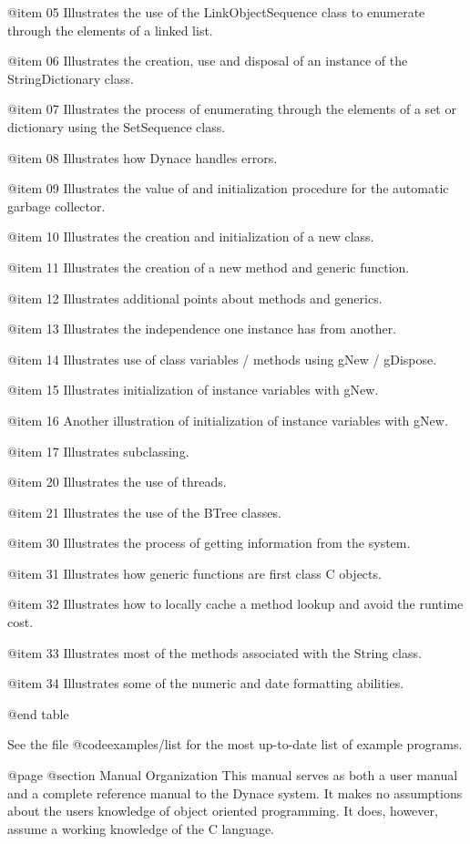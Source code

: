 @item 05
Illustrates the use of the LinkObjectSequence class to enumerate through
the elements of a linked list.

@item 06
Illustrates the creation, use and disposal of an instance of the
StringDictionary class.

@item 07
Illustrates the process of enumerating through the elements of a
set or dictionary using the SetSequence class.

@item 08
Illustrates how Dynace handles errors.

@item 09
Illustrates the value of and initialization procedure for the automatic
garbage collector.

@item 10
Illustrates the creation and initialization of a new class.

@item 11
Illustrates the creation of a new method and generic function.

@item 12
Illustrates additional points about methods and generics.

@item 13
Illustrates the independence one instance has from another.

@item 14
Illustrates use of class variables / methods using gNew / gDispose.

@item 15
Illustrates initialization of instance variables with gNew.

@item 16
Another illustration of initialization of instance variables with gNew.

@item 17
Illustrates subclassing.

@item 20
Illustrates the use of threads.

@item 21
Illustrates the use of the BTree classes.

@item 30
Illustrates the process of getting information from the system.

@item 31
Illustrates how generic functions are first class C objects.

@item 32
Illustrates how to locally cache a method lookup and avoid the
runtime cost.

@item 33
Illustrates most of the methods associated with the String class.

@item 34
Illustrates some of the numeric and date formatting abilities.

@end table


See the file @code{examples/list} for the most up-to-date list
of example programs.


@page
@section Manual Organization
This manual serves as both a user manual and a complete reference manual
to the Dynace system.  It makes no assumptions about the users knowledge
of object oriented programming.  It does, however, assume a working
knowledge of the C language.


